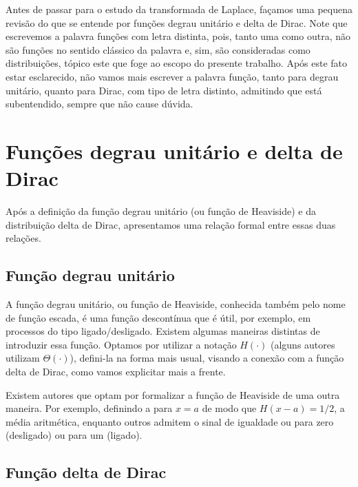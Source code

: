 Antes de passar para o estudo da transformada de Laplace, façamos uma pequena revisão do que se entende por funções degrau unitário e delta de Dirac. Note que escrevemos a palavra funções com letra distinta, pois, tanto uma como outra, não são funções no sentido clássico da palavra e, sim, são consideradas como distribuições, tópico este que foge ao escopo do presente trabalho. Após este fato estar esclarecido, não vamos mais escrever a palavra função, tanto para degrau unitário, quanto para Dirac, com tipo de letra distinto, admitindo que está subentendido, sempre que não cause dúvida.



\section{Funções degrau unitário e delta de Dirac}

Após a definição da função degrau unitário (ou função de Heaviside) e da distribuição delta de Dirac, apresentamos uma relação formal entre essas duas relações.


\subsection{Função degrau unitário}

A função degrau unitário, ou função de Heaviside, conhecida também pelo nome de função escada, é uma função descontínua que é útil, por exemplo, em processos do tipo ligado/desligado. Existem algumas maneiras distintas de introduzir essa função. Optamos por utilizar a notação $H(\cdot)$ (alguns autores utilizam $\Theta(\cdot)$), defini-la na forma mais usual, visando a conexão com a função delta de Dirac, como vamos explicitar mais a frente.


Existem autores que optam por formalizar a função de Heaviside de uma outra maneira. Por exemplo, definindo a para $x = a$ de modo que $H(x - a) = 1/2$, a média aritmética, enquanto outros admitem o sinal de igualdade ou para zero (desligado) ou para um (ligado).


\subsection{Função delta de Dirac}

